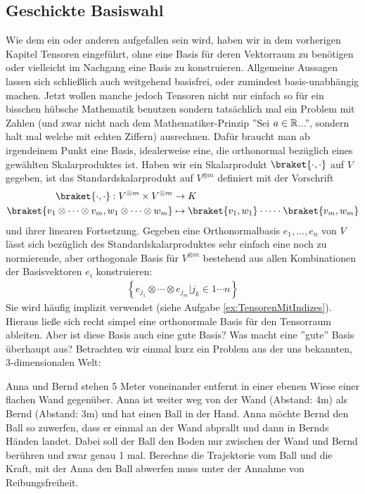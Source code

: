 
\subsection{Geschickte Basiswahl}
Wie dem ein oder anderen aufgefallen sein wird, haben wir in dem vorherigen Kapitel Tensoren eingeführt, ohne eine Basis für deren Vektorraum zu benötigen oder vielleicht im Nachgang eine Basis zu konstruieren. Allgemeine Aussagen lassen sich schließlich auch weitgehend basisfrei, oder zumindest basis-unabhängig machen. 
Jetzt wollen manche jedoch Tensoren nicht nur einfach so für ein bisschen hübsche Mathematik benutzen sondern tatsächlich mal ein Problem mit Zahlen (und zwar nicht nach dem Mathematiker-Prinzip ''Sei $a\in \mathbb{R}$...'', sondern halt mal welche mit echten Ziffern) ausrechnen. Dafür braucht man ab irgendeinem Punkt eine Basis, idealerweise eine, die orthonormal bezüglich eines gewählten Skalarproduktes ist. Haben wir ein Skalarprodukt $\braket{\cdot,\cdot}$ auf $V$ gegeben, ist das Standardskalarprodukt auf $V^{\otimes m}$ definiert mit der Vorschrift
\begin{align}
	\braket{\cdot, \cdot} : V^{\otimes m} \times V^{\otimes m} &\to K\\
	\braket{v_1 \otimes \cdots \otimes v_m, w_1 \otimes \cdots \otimes w_m} &\mapsto \braket{v_1,w_1} \cdot \cdots \cdot \braket{v_m, w_m}
\end{align}
und ihrer linearen Fortsetzung. Gegeben eine Orthonormalbasis $e_1, ..., e_n$ von $V$ lässt sich bezüglich des Standardskalarproduktes sehr einfach eine noch zu normierende, aber orthogonale Basis für $V^{\otimes m}$ bestehend aus allen Kombinationen der Basisvektoren $e_i$ konstruieren: 
\begin{align}
	\left\{e_{j_1}\otimes \cdots \otimes e_{j_m} | j_k \in {1 \cdots n} \right\}
\end{align}
Sie wird häufig implizit verwendet (siehe Aufgabe \ref{ex:TensorenMitIndizes}). Hieraus ließe sich recht simpel eine orthonormale Basis für den Tensorraum ableiten. Aber ist diese Basis auch eine gute Basis? Was macht eine ''gute'' Basis überhaupt aus?
\medbreak
Betrachten wir einmal kurz ein Problem aus der uns bekannten, 3-dimensionalen Welt: 

\begin{gridmp}{\linewidth}
	{\selectfont
	Anna und Bernd stehen 5 Meter voneinander entfernt in einer ebenen Wiese einer flachen Wand gegenüber. Anna ist weiter weg von der Wand (Abstand: 4m) als Bernd (Abstand: 3m) und hat einen Ball in der Hand. Anna möchte Bernd den Ball so zuwerfen, dass er einmal an der Wand abprallt und dann in Bernds Händen landet. Dabei soll der Ball den Boden nur zwischen der Wand und Bernd berühren und zwar genau 1 mal. Berechne die Trajektorie vom Ball und die Kraft, mit der Anna den Ball abwerfen muss unter der Annahme von Reibungsfreiheit.}
	\vspace{5cm}
\end{gridmp}

